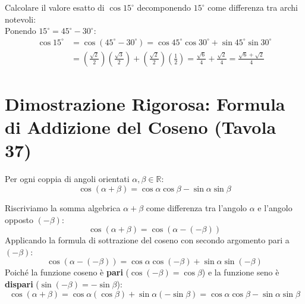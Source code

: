 \documentclass[11pt,a4paper,oneside]{report}
\begin{document}
\begin{esempio}
Calcolare il valore esatto di $\cos 15^\circ$ decomponendo $15^\circ$ come differenza tra archi notevoli:\\
Ponendo $15^\circ = 45^\circ - 30^\circ$:
\begin{align}
    \cos 15^\circ &= \cos(45^\circ - 30^\circ) = \cos 45^\circ\cos 30^\circ + \sin 45^\circ\sin 30^\circ \\
    &= \left(\frac{\sqrt{2}}{2}\right)\left(\frac{\sqrt{3}}{2}\right) + \left(\frac{\sqrt{2}}{2}\right)\left(\frac{1}{2}\right) = \frac{\sqrt{6}}{4} + \frac{\sqrt{2}}{4} = \frac{\sqrt{6} + \sqrt{2}}{4}
\end{align}
\end{esempio}

\section{Dimostrazione Rigorosa: Formula di Addizione del Coseno (Tavola 37)}

\begin{teorema}
Per ogni coppia di angoli orientati $\alpha, \beta \in \mathbb{R}$:
\begin{equation}
    \cos(\alpha + \beta) = \cos\alpha\cos\beta - \sin\alpha\sin\beta
\end{equation}
\end{teorema}

\begin{dimostrazione}
Riscriviamo la somma algebrica $\alpha + \beta$ come differenza tra l'angolo $\alpha$ e l'angolo opposto $(-\beta)$:
\begin{equation}
    \cos(\alpha + \beta) = \cos(\alpha - (-\beta))
\end{equation}
Applicando la formula di sottrazione del coseno con secondo argomento pari a $(-\beta)$:
\begin{equation}
    \cos(\alpha - (-\beta)) = \cos\alpha\cos(-\beta) + \sin\alpha\sin(-\beta)
\end{equation}
Poich\'e la funzione coseno \`e \textbf{pari} ($\cos(-\beta) = \cos\beta$) e la funzione seno \`e \textbf{dispari} ($\sin(-\beta) = -\sin\beta$):
\begin{equation}
    \cos(\alpha + \beta) = \cos\alpha(\cos\beta) + \sin\alpha(-\sin\beta) = \cos\alpha\cos\beta - \sin\alpha\sin\beta
\end{equation}
\end{dimostrazione}
\end{document}
